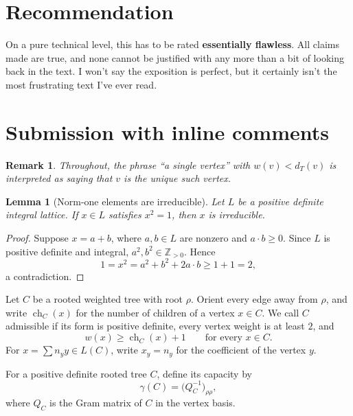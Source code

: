 \documentclass[12pt]{article}
\newtheorem{lemma}{Lemma}
\newtheorem{remark}{Remark}
\DeclareMathOperator{\ch}{ch}
\begin{document}
\section{Recommendation}

  On a pure technical level, this has to be rated \textbf{essentially flawless}. All claims made are true, and none cannot be justified with any more than a bit of looking back in the text. I won't say the exposition is perfect, but it certainly isn't the most frustrating text I've ever read.

  \section{Submission with inline comments}


\date{}



\begin{remark}
Throughout, the phrase ``a single vertex'' with \(w(v)<d_T(v)\) is interpreted as saying that \(v\) is the unique such vertex.
\end{remark}

\begin{lemma}[Norm-one elements are irreducible]
Let \(L\) be a positive definite integral lattice. If \(x\in L\) satisfies \(x^2=1\), then \(x\) is irreducible.
\end{lemma}

\begin{proof}
Suppose \(x=a+b\), where \(a,b\in L\) are nonzero and \(a\cdot b\ge 0\). Since \(L\) is positive definite and integral, \(a^2,b^2\in \mathbb Z_{>0}\). Hence
\[
1=x^2=a^2+b^2+2a\cdot b\ge 1+1=2,
\]
a contradiction.
\end{proof}

Let \(C\) be a rooted weighted tree with root \(\rho\). Orient every edge away from \(\rho\), and write \(\ch_C(x)\) for the number of children of a vertex \(x\in C\). We call \(C\) admissible if its form is positive definite, every vertex weight is at least \(2\), and
\[
w(x)\ge \ch_C(x)+1
\qquad \text{for every } x\in C.
\]
For \(x=\sum n_y y\in L(C)\), write \(x_y=n_y\) for the coefficient of the vertex \(y\).

For a positive definite rooted tree \(C\), define its capacity by
\[
\gamma(C)=\bigl(Q_C^{-1}\bigr)_{\rho\rho},
\]
where \(Q_C\) is the Gram matrix of \(C\) in the vertex basis.
\end{document}
